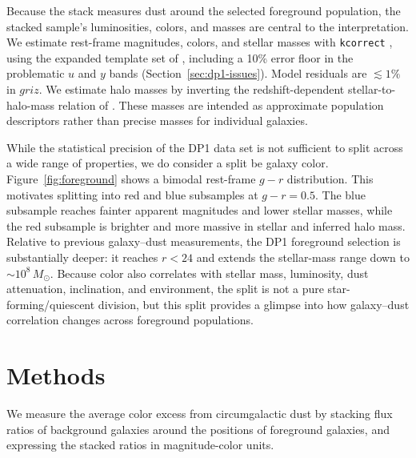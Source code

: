 \documentclass[linenumbers, twocolumn]{aastex701}
\begin{document}
Because the stack measures dust around the selected foreground population, the stacked sample's luminosities, colors, and masses are central to the interpretation.
We estimate rest-frame magnitudes, colors, and stellar masses with \texttt{kcorrect} \citep{blanton2007}, using the expanded template set of \citet{pai2024}, including a 10\% error floor in the problematic $u$ and $y$ bands (Section~\ref{sec:dp1-issues}).
Model residuals are $\lesssim 1\%$ in $griz$.
We estimate halo masses by inverting the redshift-dependent stellar-to-halo-mass relation of \citet{moster2013}.
These masses are intended as approximate population descriptors rather than precise masses for individual galaxies.

While the statistical precision of the DP1 data set is not sufficient to split across a wide range of properties, we do consider a split be galaxy color. Figure~\ref{fig:foreground} shows a bimodal rest-frame $g - r$ distribution.  This motivates splitting into red and blue subsamples at $g - r = 0.5$.
The blue subsample reaches fainter apparent magnitudes and lower stellar masses, while the red subsample is brighter and more massive in stellar and inferred halo mass.
Relative to previous galaxy--dust measurements, the DP1 foreground selection is substantially deeper: it reaches $r<24$ and extends the stellar-mass range down to $\sim10^8 \, M_\odot$.
Because color also correlates with stellar mass, luminosity, dust attenuation, inclination, and environment, the split is not a pure star-forming/quiescent division, but this split provides a glimpse into how galaxy--dust correlation changes across foreground populations.


\section{Methods}
\label{sec:methods}

We measure the average color excess from circumgalactic dust by stacking flux ratios of background galaxies around the positions of foreground galaxies, and expressing the stacked ratios in magnitude-color units.
\end{document}
